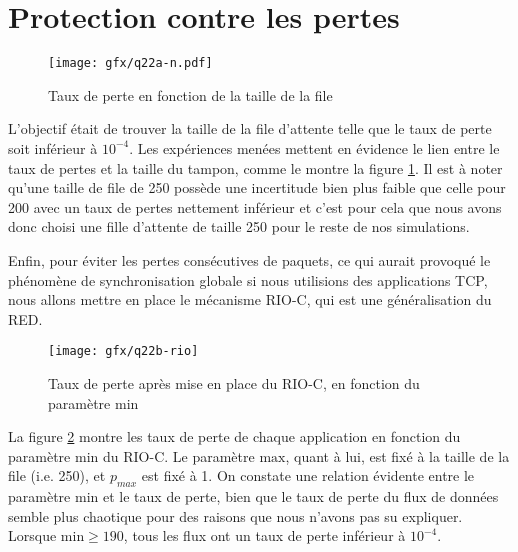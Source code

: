 \section{Protection contre les pertes}

\begin{figure}[htb]
	\centering
	\texttt{[image: gfx/q22a-n.pdf]}
	\caption{Taux de perte en fonction de la taille de la file}
	\label{fig:q22a-n}
\end{figure}

L'objectif était de trouver la taille de la file d'attente telle que le taux de
perte soit inférieur à $10^{-4}$.  Les expériences menées mettent en évidence le
lien entre le taux de pertes et la taille du tampon, comme le montre la figure
\ref{fig:q22a-n}. Il est à noter qu'une taille de file de 250 possède une
incertitude bien plus faible que celle pour 200 avec un taux de pertes nettement
inférieur et c'est pour cela que nous avons donc choisi une fille d'attente de
taille 250 pour le reste de nos simulations.

Enfin, pour éviter les pertes consécutives de paquets, ce qui aurait provoqué le
phénomène de synchronisation globale si nous utilisions des applications TCP,
nous allons mettre en place le mécanisme RIO-C, qui est une généralisation du
RED.

\begin{figure}[htb]
	\centering
	\texttt{[image: gfx/q22b-rio]}
	\caption{Taux de perte après mise en place du RIO-C, en fonction
	du paramètre $\mathrm{min}$}
	\label{fig:q22b-rio}
\end{figure}

La figure \ref{fig:q22b-rio} montre les taux de perte de chaque application en
fonction du paramètre $\mathrm{min}$ du RIO-C.  Le paramètre $\mathrm{max}$,
quant à lui, est fixé à la taille de la file (i.e. 250), et $p_{max}$ est fixé à
1.  On constate une relation évidente entre le paramètre $\mathrm{min}$ et le
taux de perte, bien que le taux de perte du flux de données semble plus
chaotique pour des raisons que nous n'avons pas su expliquer.  Lorsque
$\mathrm{min} \ge 190$, tous les flux ont un taux de perte inférieur à $10^{-4}$.


